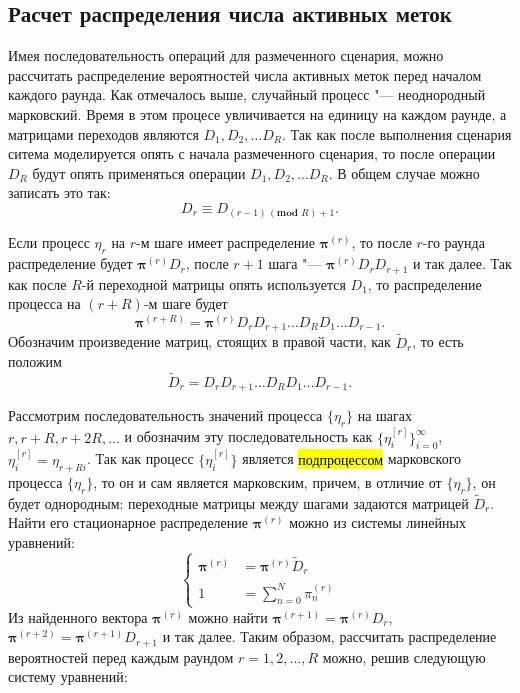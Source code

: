 \subsection{Расчет распределения числа активных меток}
Имея последовательность операций для размеченного сценария, можно рассчитать распределение вероятностей числа активных меток перед началом каждого раунда. Как отмечалось выше, случайный процесс "--- неоднородный марковский. Время в этом процесе увличивается на единицу на каждом раунде, а матрицами переходов являются $D_1, D_2, \dots D_R$. Так как после выполнения сценария ситема моделируется опять с начала  размеченного сценария, то после операции $D_R$ будут опять применяться операции $D_1, D_2, \dots D_R$. В общем случае можно записать это так:
$$
	D_r \equiv D_{(r - 1)\, (\textbf{mod } R) + 1}.
$$

Если процесс $\eta_r$ на $r$-м шаге имеет распределение $\bm{\pi}^{(r)}$, то после $r$-го раунда распределение будет $\bm{\pi}^{(r)} D_r$, после $r+1$ шага "--- $\bm{\pi}^{(r)} D_r D_{r+1}$ и так далее. Так как после $R$-й переходной матрицы опять используется $D_1$, то распределение процесса на $(r+R)$-м шаге будет
$$
	\bm{\pi}^{(r+R)} = \bm{\pi}^{(r)} D_r D_{r+1} \dots D_R D_1 \dots D_{r-1}.
$$
Обозначим произведение матриц, стоящих в правой части, как $\widetilde{D}_{r}$, то есть положим
$$
	\widetilde{D}_r = D_r D_{r+1} \dots D_R D_1 \dots D_{r-1}.
$$

Рассмотрим последовательность значений процесса $\{ \eta_r \}$ на шагах $r, r+R, r+2R, \dots$ и обозначим эту последовательность как $\{ \eta_i^{[r]} \}_{i=0}^\infty$, $\eta_i^{[r]} = \eta_{r+Ri}$. Так как процесс $\{ \eta_{i}^{[r]} \}$ является \hl{подпроцессом} марковского процесса $\{ \eta_r \}$, то он и сам является марковским, причем, в отличие от $\{ \eta_r \}$, он будет однородным: переходные матрицы между шагами задаются матрицей $\widetilde{D}_r$. Найти его стационарное распределение $\bm{\pi}^{(r)}$ можно из системы линейных уравнений:
$$
	\begin{cases}
		\bm{\pi}^{(r)} &= \bm{\pi}^{(r)} \widetilde{D}_r\\
		1 &= \sum\limits_{n=0}^{\overline{N}} \pi^{(r)}_n
	\end{cases}
$$
Из найденного вектора $\bm{\pi}^{(r)}$ можно найти $\bm{\pi}^{(r+1)} = \bm{\pi}^{(r)} D_r$, $\bm{\pi}^{(r+2)} = \bm{\pi}^{(r+1)} D_{r+1}$ и так далее. Таким образом, рассчитать распределение вероятностей перед каждым раундом $r = 1, 2, \dots, R$ можно, решив следующую систему уравнений:

